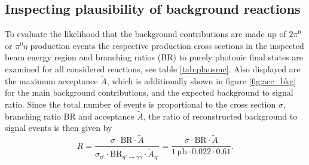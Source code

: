\subsection{Inspecting plausibility of background reactions}
To evaluate the likelihood that the background contributions are made up of $2\pi^0$ or $\pi^0\eta$ production events the respective production cross sections in the inspected beam energy region and branching ratios (BR) to purely photonic final states are examined for all considered reactions, see table \ref{tab:plausmc}. Also displayed are the maximum acceptance $\tilde{A}$, which is additionally shown in figure \ref{fig:acc_bkg} for the main background contributions, and the expected background to signal ratio. Since the total number of events is proportional to the cross section $\sigma$, branching ratio BR and acceptance $\tilde{A}$, the ratio of reconstructed background to signal events is then given by 
\begin{equation}
	R=\frac{\sigma\cdot\text{BR}\cdot\tilde{A}}{\sigma_{\eta'}\cdot\text{BR}_{\eta'\to\gamma\gamma}\cdot\tilde{A}_{\eta'}}=\frac{\sigma\cdot\text{BR}\cdot\tilde{A}}{\SI{1}{\micro\barn}\cdot0.022\cdot0.61}.
	\label{eq:r}
\end{equation}
